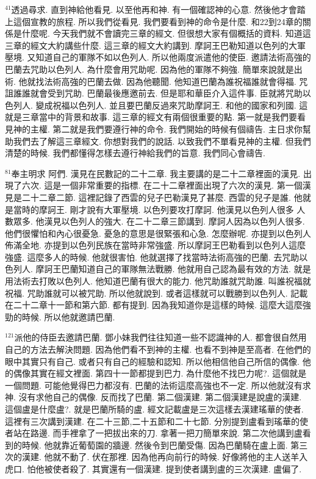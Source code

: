 \documentclass{book}
\begin{document}
$^{41}$透過尋求.
直到神給他看見.
以至他再和神.
有一個確認神的心意.
然後他才會踏上這個宣教的旅程.
所以我們從看見.
我們要看到神的命令是什麼.
和22到24章的關係是什麼呢.
今天我們就不會讀完三章的經文.
但很想大家有個概括的資料.
知道這三章的經文大約講些什麼.
這三章的經文大約講到.
摩訶王巴勒知道以色列的大軍壓境.
又知道自己的軍隊不如以色列人.
所以他兩度派遣他的使臣.
邀請法術高強的巴蘭去咒助以色列人.
為什麼會用咒助呢.
因為他的軍隊不夠強.
簡單來說就是出術.
他就找法術高強的巴蘭去做.
因為他聽聞.
他知道巴蘭為誰祝福誰就會得福.
咒詛誰誰就會受到咒助.
巴蘭最後應邀前去.
但是耶和華臣介入這件事.
臣就將咒助以色列人.
變成祝福以色列人.
並且要巴蘭反過來咒助摩訶王.
和他的國家和列國.
這就是三章當中的背景和故事.
這三章的經文有兩個很重要的點.
第一就是我們要看見神的主權.
第二就是我們要遵行神的命令.
我們開始的時候有個禱告.
主日求你幫助我們去了解這三章經文.
你想對我們的說話.
以致我們不單看見神的主權.
但我們清楚的時候.
我們都懂得怎樣去遵行神給我們的旨意.
我們同心會禱告.

$^{81}$奉主明求 阿們.
漢見在民數記的二十二章.
我主要講的是二十二章裡面的漢見.
出現了六次.
這是一個非常重要的指標.
在二十二章裡面出現了六次的漢見.
第一個漢見是二十二章二節.
這裡記錄了西雲的兒子巴勒漢見了甚麼.
西雲的兒子是誰.
他就是當時的摩訶王.
剛才說有大軍壓境.
以色列要攻打摩訶.
他漢見以色列人很多 人數眾多.
他漢見以色列人的強大.
在二十二章三節講到.
摩訶人因為以色列人很多.
他們很懼怕和內心很憂急.
憂急的意思是很緊張和心急.
怎麼辦呢.
亦提到以色列人佈滿全地.
亦提到以色列民族在當時非常強盛.
所以摩訶王巴勒看到以色列人這麼強盛.
這麼多人的時候.
他就很害怕.
他就選擇了找當時法術高強的巴蘭.
去咒助以色列人.
摩訶王巴蘭知道自己的軍隊無法戰勝.
他就用自己認為最有效的方法.
就是用法術去打敗以色列人.
他知道巴蘭有很大的能力.
他咒助誰就咒助誰.
叫誰祝福就祝福.
咒助誰就可以被咒助.
所以他就說到.
或者這樣就可以戰勝到以色列人.
記載在二十二章十一節和第六節.
都有提到.
因為我知道你是這樣的時候.
這麼大這麼強勁的時候.
所以他就邀請巴蘭.

$^{121}$派他的侍臣去邀請巴蘭.
鄧小妹我們往往知道一些不認識神的人.
都會很自然用自己的方法去解決問題.
因為他們看不到神的主權.
也看不到神是至高者.
在他們的眼中其實只有自己.
或者只有自己的經驗和認知.
所以他相信他自己所信的偶像.
他的偶像其實在經文裡面.
第四十一節都提到巴力.
為什麼他不找巴力呢?.
這個就是一個問題.
可能他覺得巴力都沒有.
巴蘭的法術這麼高強也不一定.
所以他就沒有求神.
沒有求他自己的偶像.
反而找了巴蘭.
第二個漢建.
第二個漢建是說盧的漢建.
這個盧是什麼盧?.
就是巴蘭所騎的盧.
經文記載盧是三次這樣去漢建瑤華的使者.
這裡有三次講到漢建.
在二十三節,二十五節和二十七節.
分別提到盧看到瑤華的使者站在路邊.
而手裡拿了一把拔出來的刀.
拿著一把刀簡單來說.
第二次他講到盧看到的時候.
他就靠近葡萄園的牆邊.
然後令到巴蘭受傷.
因為巴蘭騎在盧上面.
第三次的漢建.
他就不動了.
伏在那裡.
因為他再向前行的時候.
好像將他的主人送羊入虎口.
怕他被使者殺了.
其實還有一個漢建.
提到使者講到盧的三次漢建.
盧偏了.
\end{document}
